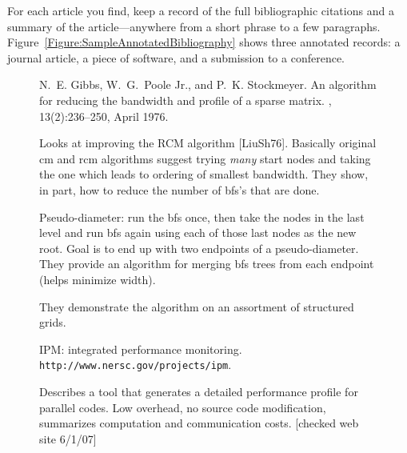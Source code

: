 \documentclass[finalcopy]{srpaper}
\def\hyperref[#1]{}
\let\plainref\ref
\let\plainurl\url
\newcommand{\plainref}{\ref*}
\let\plainurl\nolinkurl
\newcommand{\namedref}[2]{\hyperref[#2]{#1~\plainref{#2}}}
\begin{document}
For each article you find, keep a record of the full
bibliographic citations and a summary of the
article---anywhere from a short phrase to a few
paragraphs. \namedref{Figure}{Figure:SampleAnnotatedBibliography}
shows three annotated records: a journal article, a piece of
software, and a submission to a conference.
\begin{figure}
\begin{center}
\begin{minipage}{0.9\textwidth}
\renewcommand{\chapter}[2]{}
\renewenvironment{quotation}{\par}{}
\footnotesize
\begin{thebibliography}{GJS76}
N.~E. Gibbs, W.~G.~Poole Jr., and P.~K. Stockmeyer.
\newblock An algorithm for reducing the bandwidth and
  profile of a sparse matrix.
, 13(2):236--250, April
  1976.
\begin{quotation}\noindent
  Looks at improving the RCM algorithm [LiuSh76].  Basically
  original cm and rcm algorithms suggest trying \emph{many}
  start nodes and taking the one which leads to ordering of
  smallest bandwidth. They show, in part, how to reduce the
  number of bfs's that are done.\par
  Pseudo-diameter: run the bfs once, then take the nodes in
  the last level and run bfs again using each of those last
  nodes as the new root. Goal is to end up with two
  endpoints of a pseudo-diameter. They provide an algorithm
  for merging bfs trees from each endpoint (helps minimize
  width).\par They demonstrate the algorithm on an
  assortment of structured grids.
\end{quotation}
\par\vspace{0.5\topsep}
{IPM}: integrated performance monitoring.
\newblock \plainurl{http://www.nersc.gov/projects/ipm}.
\begin{quotation}\noindent
  Describes a tool that generates a detailed performance
  profile for parallel codes. Low overhead, no source code
  modification, summarizes computation and communication
  costs. [checked web site 6/1/07]
\end{quotation}
\par\vspace{0.5\topsep}

\end{thebibliography}
\end{minipage}
\end{center}
\end{figure}
\end{document}
